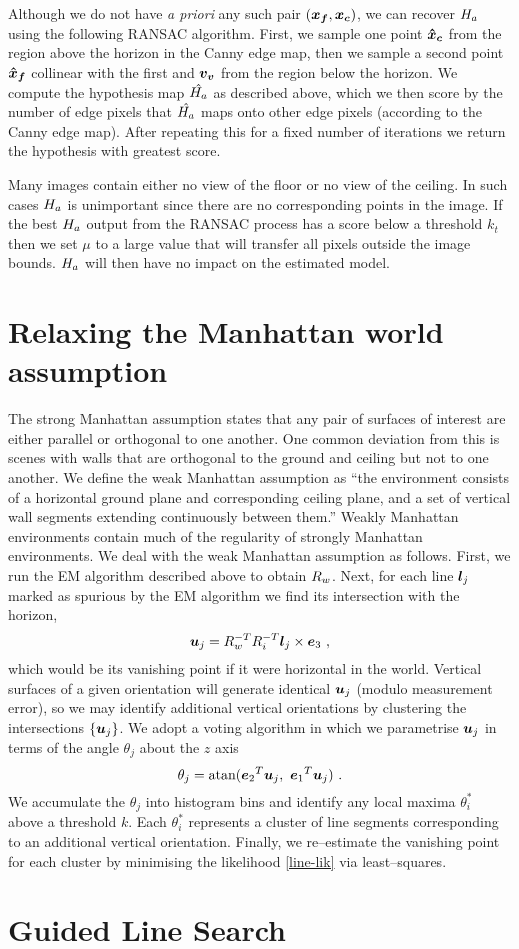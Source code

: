 Although we do not have \textit{a priori} any such pair
$(\vect{x_f},\vect{x_c})$, we can recover $\Hcf$ using the following
RANSAC algorithm. First, we sample one point $\vect{\hat{x}_c}$ from
the region above the horizon in the Canny edge map, then we sample a
second point $\vect{\hat{x}_f}$ collinear with the first and
$\vvpt$ from the region below the horizon. We compute the
hypothesis map $\Hcfhat$ as described above, which we then score by
the number of edge pixels that $\Hcfhat$ maps onto other edge pixels
(according to the Canny edge map). After repeating this for a fixed
number of iterations we return the hypothesis with greatest score.

Many images contain either no view of the floor or no view of the
ceiling. In such cases $\Hcf$ is unimportant since there are no
corresponding points in the image. If the best $\Hcf$ output from the
RANSAC process has a score below a threshold $k_t$ then we set $\mu$
to a large value that will transfer all pixels outside the image
bounds. $\Hcf$ will then have no impact on the estimated model.

\section{Relaxing the Manhattan world assumption}
The strong Manhattan assumption states that any pair of surfaces of
interest are either parallel or orthogonal to one another. One common
deviation from this is scenes with walls that are orthogonal to the
ground and ceiling but not to one another. We define the weak
Manhattan assumption as ``the environment consists of a horizontal
ground plane and corresponding ceiling plane, and a set of vertical
wall segments extending continuously between them.'' Weakly Manhattan
environments contain much of the regularity of strongly Manhattan
environments. We deal with the weak Manhattan assumption as
follows. First, we run the EM algorithm described above to obtain
$\SceneR$. Next, for each line $\LineSeg_j$ marked as spurious by the EM
algorithm we find its intersection with the horizon,
\begin{equation}
  \vect{u}_j = \SceneR^{-T} R_i^{-T} \LineSeg_j \times \ez ~,
\end{equation}
which would be its vanishing point if it were horizontal in the
world. Vertical surfaces of a given orientation will generate
identical $\vect{u}_j$ (modulo measurement error), so we may identify
additional vertical orientations by clustering the intersections
$\{\vect{u}_j\}$. We adopt a voting algorithm in which we parametrise
$\vect{u}_j$ in terms of the angle $\theta_j$ about the $z$ axis
\begin{equation}
  \theta_{j} = \mbox{atan}
  ({\ey}^T\vect{u}_j,~ {\ex}^T\vect{u}_j) ~.
\end{equation}
We accumulate the $\theta_j$ into histogram bins and identify any
local maxima $\theta_i^*$ above a threshold $k$. Each $\theta_i^*$
represents a cluster of line segments corresponding to an additional
vertical orientation. Finally, we re--estimate the vanishing point for
each cluster by minimising the likelihood \eqref{line-lik} via
least--squares.

\section{Guided Line Search}
